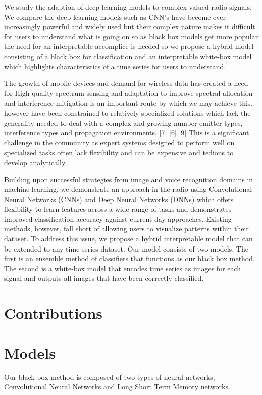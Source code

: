 \documentclass{turabian-thesis}
\begin{document}
We study the adaption of deep learning models to complex-valued radio signals. We compare the deep learning models such as CNN’s have become ever-increasingly powerful and widely used but their complex nature makes it difficult for users to understand what is going on so as black box models get more popular the need for an interpretable accomplice is needed so we propose a hybrid model consisting of a black box for classification and an interpretable white-box model which highlights characteristics of a time series for users to understand. 

The growth of mobile devices and demand for wireless data has created a need for  High quality spectrum sensing and adaptation to improve spectral allocation and interference mitigation is an important route by which we may achieve this.  however have been constrained to relatively specialized solutions which lack the generality needed to deal with a complex and growing number emitter types, interference types and propagation environments. [7] [6] [9]
This is a significant challenge in the community as expert systems designed to perform well on specialized tasks often lack flexibility and can be expensive and tedious to develop analytically

Building upon successful strategies from image and voice recognition domains in machine learning, we demonstrate an approach in the radio using Convolutional Neural Networks (CNNs) and Deep Neural Networks (DNNs) which offers flexibility to learn features across a wide range of tasks and demonstrates improved classification accuracy against current day approaches.  Existing methods, however, fall short of allowing users to visualize patterns within their dataset. To address this issue, we propose a hybrid interpretable model that can be extended to any time series dataset. Our model consists of two models. The first is an ensemble method of classifiers that functions as our black box method. The second is a white-box model that encodes time series as images for each signal and outputs all images that have been correctly classified.
\section{Contributions}

\section{Models}
Our black box method is composed of two types of neural networks, Convolutional Neural Networks and Long Short Term Memory networks.
\end{document}

